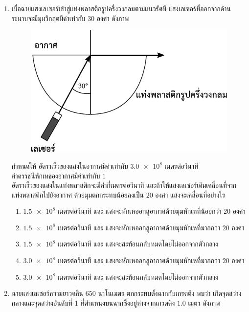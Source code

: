 \documentclass[a4paper, 12pt]{article}
\begin{document}
\begin{enumerate}
\begin{enumerate}
          \end{enumerate}
          \newpage
    \item เมื่อฉายแสงเลเซอร์เข้าสู่แท่งพลาสติกรูปครึ่งวงกลมตามแนวรัศมี แสงเลเซอร์ที่ออกจากด้านระนาบจะมีมุมวิกฤตมีค่าเท่ากับ \(30\) องศา ดังภาพ \\
          \begin{figure}[H]
              \centering
              \includegraphics{images/25_12.pdf}
          \end{figure}
          กำหนดให้ อัตราเร็วของแสงในอากาศมีค่าเท่ากับ \(\num{3.0e8}\) เมตรต่อวินาที \\
          ค่าดรรชนีหักเหของอากาศมีค่าเท่ากับ \(1\) \\
          อัตราเร็วของแสงในแท่งพลาสติกจะมีค่ากี่เมตรต่อวินาที และถ้าให้แสงเลเซอร์เดิมเคลื่อนที่จากแท่งพลาสติกไปยังอากาศ ด้วยมุมตกกระทบน้อยลงเป็น \(20\) องศา แสงจะเคลื่อนที่อย่างไร
          \begin{enumerate}
              \item \(\num{1.5e8}\) เมตรต่อวินาที และ แสงจะหักเหออกสู่อากาศด้วยมุมหักเหที่น้อยกว่า \(20\) องศา
              \item \(\num{1.5e8}\) เมตรต่อวินาที และ แสงจะหักเหออกสู่อากาศด้วยมุมหักเหที่มากกว่า \(20\) องศา
              \item \(\num{1.5e8}\) เมตรต่อวินาที และ แสงจะสะท้อนกลับหมดโดยไม่ออกจากตัวกลาง
              \item \(\num{3.0e8}\) เมตรต่อวินาที และ แสงจะหักเหออกสู่อากาศด้วยมุมหักเหที่มากกว่า \(20\) องศา
              \item \(\num{3.0e8}\) เมตรต่อวินาที และ แสงจะสะท้อนกลับหมดโดยไม่ออกจากตัวกลาง
          \end{enumerate}
          \newpage
    \item ฉายแสงเลเซอร์ความยาวคลื่น \(650\) นาโนเมตร ตกกระทบตั้งฉากกับเกรตติง พบว่า เกิดจุดสว่างกลางและจุดสว่างอันดับที่ 1 ที่ตำแหน่งบนฉากซึ่งอยู่ห่างจากเกรตติง \(1.0\) เมตร ดังภาพ \\

\end{enumerate}
\end{document}
